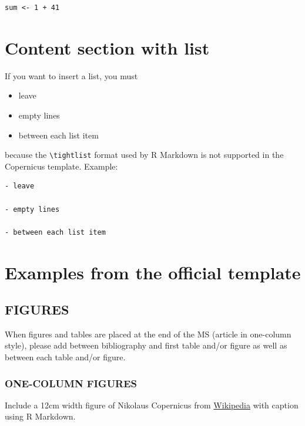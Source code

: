 \documentclass[gmd, manuscript]{copernicus}
\begin{document}
\begin{verbatim}
sum <- 1 + 41
\end{verbatim}

\section{Content section with list}

If you want to insert a list, you must

\begin{itemize}
\item
  leave
\item
  empty lines
\item
  between each list item
\end{itemize}

because the \texttt{\textbackslash{}tightlist} format used by R Markdown
is not supported in the Copernicus template. Example:

\begin{verbatim}
- leave

- empty lines

- between each list item
\end{verbatim}

\section{Examples from the official template}

\subsection{FIGURES}

When figures and tables are placed at the end of the MS (article in
one-column style), please add \clearpage between bibliography and first
table and/or figure as well as between each table and/or figure.

\subsubsection{ONE-COLUMN FIGURES}

Include a 12cm width figure of Nikolaus Copernicus from
\href{https://en.wikipedia.org/wiki/File:Nikolaus_Kopernikus.jpg}{Wikipedia}
with caption using R Markdown.
\end{document}
